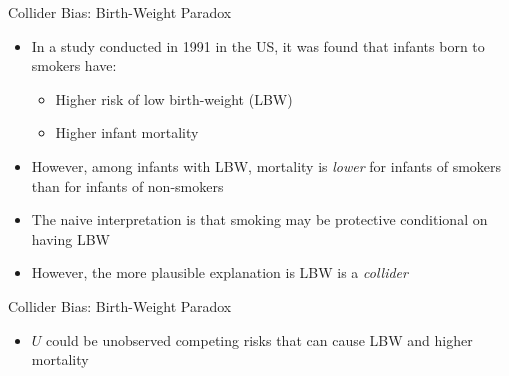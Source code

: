 \documentclass[aspectratio=1610,12pt,xcolor=dvipsnames]{beamer}
\begin{document}
\begin{frame}{Collider Bias: Birth-Weight Paradox}

\begin{itemize}
    \item In a study conducted in 1991 in the US, it was found that infants born to smokers have:
    \begin{itemize}
        \item Higher risk of low birth-weight (LBW)
        \item Higher infant mortality
    \end{itemize}
    \item However, among infants with LBW, mortality is \textit{lower} for infants of smokers than for infants of non-smokers
    \item The naive interpretation is that smoking may be protective conditional on having LBW
    \item However, the more plausible explanation is LBW is a \textit{collider}
\end{itemize}
\end{frame}

\begin{frame}{Collider Bias: Birth-Weight Paradox}

\begin{itemize}
    \item $U$ could be unobserved competing risks that can cause LBW and higher mortality
\end{itemize}

\centering
{}
\end{frame}
\end{document}
